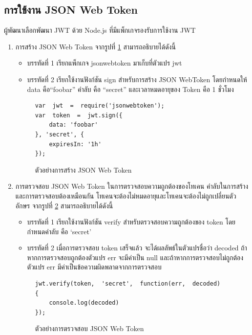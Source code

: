 	\subsection{การใช้งาน JSON Web Token}
	ผู้พัฒนาเลือกพัฒนา JWT ด้วย Node.js ที่มีแพ็กเกจรองรับการใช้งาน JWT
	\begin{enumerate}
		\item การสร้าง JSON Web Token
		จากรูปที่ \ref{Fig:SignJWT} สามารถอธิบายได้ดังนี้
		\begin{itemize}
			\item บรรทัดที่ 1 เรียกแพ็กเกจ jsonwebtoken มาเก็บที่ตัวแปร jwt
			\item บรรทัดที่ 2 เรียกใช้งานฟังก์ชัน sign สำหรับการสร้าง JSON WebToken โดยกำหนดให้ data คือ“foobar” คำลับ คือ “secret” และเวลาหมดอายุของ Token คือ 1 ชั่วโมง
		\end{itemize}
		\begin{figure}[H]
			{\begin{lstlisting}
var  jwt  =  require('jsonwebtoken');  
var  token  =  jwt.sign({  
	data: 'foobar'  
}, 'secret', {  
	expiresIn: '1h'  
});  
			\end{lstlisting}}
			\caption{ตัวอย่างการสร้าง JSON Web Token}
			\label{Fig:SignJWT}
		\end{figure}

		\item การตรวจสอบ JSON Web Token
			ในการตรวจสอบความถูกต้องของโทเคน คำลับในการสร้างและการตรวจสอบต้องเหมือนกัน 
			โทเคนจะต้องไม่หมดอายุและโทเคนจะต้องไม่ถูกเปลี่ยนตัวอักษร
			จากรูปที่ \ref{Fig:VerifyJWT} สามารถอธิบายได้ดังนี้
			\begin{itemize}
				\item บรรทัดที่ 1 เรียกใช้งานฟังก์ชัน verify สำหรับตรวจสอบความถูกต้องของ token โดยกำหนดคำลับ คือ ‘secret’ 
				\item บรรทัดที่ 2 เมื่อการตรวจสอบ token เสร็จแล้ว จะได้ผลลัพธ์ในตัวแปรชื่อว่า decoded ถ้าหากการตรวจสอบถูกต้องตัวแปร err จะมีค่าเป็น null และถ้าหากการตรวจสอบไม่ถูกต้องตัวแปร err มีค่าเป็นข้อความผิดพลาดจากการตรวจสอบ
			\end{itemize}
			\begin{figure}[H]
				{\begin{lstlisting}
jwt.verify(token,  'secret',  function(err,  decoded)  {  
	console.log(decoded)  
});  
				\end{lstlisting}}
				\caption{ตัวอย่างการตรวจสอบ JSON Web Token}
				\label{Fig:VerifyJWT}
			\end{figure}
	\end{enumerate}
	
